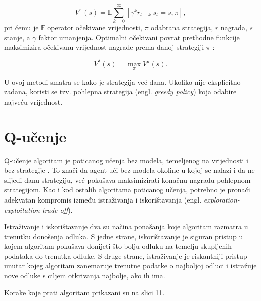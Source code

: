 \documentclass[]{foi} %
\begin{document}
\[ V^\pi (s) = \mathbb{E} \sum_{k=0}^{\infty}[\gamma^k r_{t+k} | s_t = s, \pi], \]
pri čemu je $\mathbb{E}$ operator očekivane vrijednosti, $\pi$ odabrana strategija, $r$ nagrada, $s$ stanje, a $\gamma$ faktor umanjenja. Optimalni očekivani povrat prethodne funkcije maksimizira očekivanu vrijednost nagrade prema danoj strategiji $\pi$ \cite{valueBased}:

\[ V^* (s) = \max_\pi V^\pi (s) .\]

U ovoj metodi smatra se kako je strategija već dana. Ukoliko nije eksplicitno zadana, koristi se tzv. pohlepna strategija (engl. \textit{greedy policy}) koja odabire najveću vrijednost.


\section{Q-učenje}
Q-učenje algoritam je poticanog učenja bez modela, temeljenog na vrijednosti i bez strategije \cite[str. 74-75]{AIandGames}. To znači da agent uči bez modela okoline u kojoj se nalazi i da ne slijedi danu strategiju, već pokušava maksimizirati konačnu nagradu pohlepnom strategijom. Kao i kod ostalih algoritama poticanog učenja, potrebno je pronaći adekvatan kompromis između istraživanja i iskorištavanja (engl. \textit{exploration-exploitation trade-off}). 

Istraživanje i iskorištavanje dva su načina ponašanja \cite{qucenjeMedium} koje algoritam razmatra u trenutku donošenja odluka. S jedne strane, iskorištavanje je siguran pristup u kojem algoritam pokušava donijeti što bolju odluku na temelju skupljenih podataka do trenutka odluke. S druge strane, istraživanje je riskantniji pristup unutar kojeg algoritam zanemaruje trenutne podatke o najboljoj odluci i istražuje nove odluke s ciljem otkrivanja najbolje, ako ih ima.

Korake koje prati algoritam prikazani su na \hyperref[img: qucenje]{slici 11}.
\end{document}
